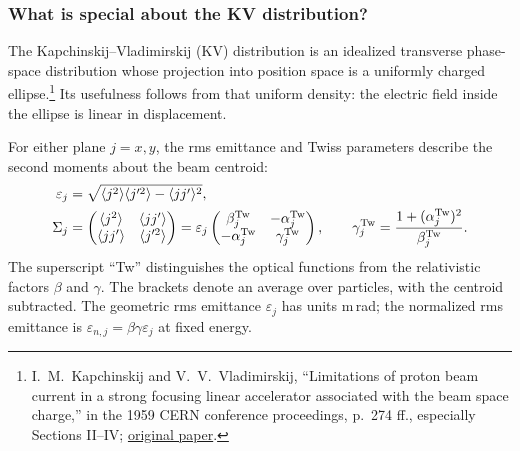 \subsubsection{What is special about the KV distribution?}
The Kapchinskij--Vladimirskij (KV) distribution is an idealized transverse
phase-space distribution whose projection into position space is a uniformly
charged ellipse.\footnote{I.~M.~Kapchinskij and V.~V.~Vladimirskij,
``Limitations of proton beam current in a strong focusing linear accelerator
associated with the beam space charge,'' in the 1959 CERN conference proceedings,
p.~274 ff., especially Sections II--IV;
\href{https://s3.cern.ch/inspire-prod-files-5/526fe2f2ff6f05063bcb9a9b08da12f9}{original paper}.}
Its usefulness follows from that uniform density: the electric field inside
the ellipse is linear in displacement.

For either plane $j=x,y$, the rms emittance and Twiss parameters describe the
second moments about the beam centroid:
\begin{equation}
 \begin{aligned}
 \varepsilon_j&=\sqrt{\langle j^2\rangle\langle j'^2\rangle
                         -\langle jj'\rangle^2},\\
 \Sigma_j&=\begin{pmatrix}\langle j^2\rangle&\langle jj'\rangle\\
                 \langle jj'\rangle&\langle j'^2\rangle\end{pmatrix}
 =\varepsilon_j\begin{pmatrix}\beta_j^{\rm Tw}&-\alpha_j^{\rm Tw}\\
                 -\alpha_j^{\rm Tw}&\gamma_j^{\rm Tw}\end{pmatrix},
 \qquad \gamma_j^{\rm Tw}=\frac{1+(\alpha_j^{\rm Tw})^2}{\beta_j^{\rm Tw}}.
 \end{aligned}
 \label{eq:sc-twiss}
\end{equation}
The superscript ``Tw'' distinguishes the optical functions from the relativistic
factors $\beta$ and $\gamma$. The brackets denote an average over particles,
with the centroid subtracted. The geometric rms emittance $\varepsilon_j$ has
units m\,rad; the normalized rms emittance is
$\varepsilon_{n,j}=\beta\gamma\varepsilon_j$ at fixed energy.

